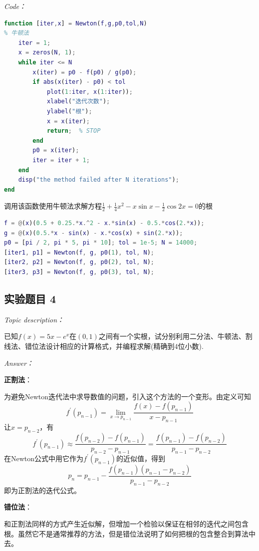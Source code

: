 \documentclass[12pt]{ctexart}
\begin{document}
	\textit{Code：}
	
\begin{lstlisting}[language = MATLAB]
function [iter,x] = Newton(f,g,p0,tol,N)
% 牛顿法
	iter = 1;
	x = zeros(N, 1);
	while iter <= N
		x(iter) = p0 - f(p0) / g(p0);
		if abs(x(iter) - p0) < tol
			plot(1:iter, x(1:iter));
			xlabel("迭代次数");
			ylabel("根");
			x = x(iter);
			return;  % STOP
		end
		p0 = x(iter);
		iter = iter + 1;
	end
	disp("the method failed after N iterations");
end
\end{lstlisting}
	
	调用该函数使用牛顿法求解方程$\frac{1}{2}+\frac{1}{4}x^2-x\sin x-\frac{1}{2}\cos 2x=0$的根
	
\begin{lstlisting}[language = MATLAB]
% 第2章第3题
f = @(x)(0.5 + 0.25.*x.^2 - x.*sin(x) - 0.5.*cos(2.*x));
g = @(x)(0.5.*x - sin(x) - x.*cos(x) + sin(2.*x));
p0 = [pi / 2, pi * 5, pi * 10]; tol = 1e-5; N = 14000;
[iter1, p1] = Newton(f, g, p0(1), tol, N);
[iter2, p2] = Newton(f, g, p0(2), tol, N);
[iter3, p3] = Newton(f, g, p0(3), tol, N);
\end{lstlisting}

	\subsection{实验题目 4}
	\textit{Topic description：}
	
	已知$f(x)=5x-e^x$在$(0,1)$之间有一个实根，试分别利用二分法、牛顿法、割线法、错位法设计相应的计算格式，并编程求解(精确到4位小数).
	
	\textit{Answer：}
	
	\textbf{正割法}：
	
	为避免Newton迭代法中求导数值的问题，引入这个方法的一个变形。由定义可知$$f^{'}(p_{n-1})=\lim\limits_{x\rightarrow p_{n-1}}\frac{f(x)-f(p_{n-1})}{x-p_{n-1}}$$让$x=p_{n-2}$，有$$f^{'}(p_{n-1})\approx \frac{f(p_{n-2})-f(p_{n-1})}{p_{n-2}-p_{n-1}}=\frac{f(p_{n-1})-f(p_{n-2})}{p_{n-1}-p_{n-2}}$$在Newton公式中用它作为$f^{'}(p_{n-1})$的近似值，得到$$p_n=p_{n-1}-\frac{f(p_{n-1})(p_{n-1}-p_{n-2})}{p_{n-1}-p_{n-2}}$$即为正割法的迭代公式。
	
	\textbf{错位法}：
	
	和正割法同样的方式产生近似解，但增加一个检验以保证在相邻的迭代之间包含根。虽然它不是通常推荐的方法，但是错位法说明了如何把根的包含整合到算法中去。
	
\end{document}
